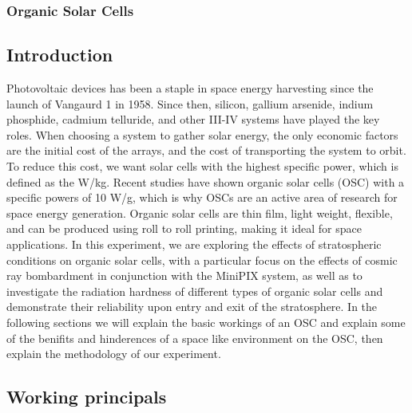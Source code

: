 \subsubsection{Organic Solar Cells}

	\subsection{Introduction}
	Photovoltaic devices has been a staple in space energy harvesting since the launch of Vangaurd 1 in 1958. Since then, silicon, gallium arsenide, indium phosphide, cadmium telluride, and other III-IV systems have played the key roles. When choosing a system to gather solar energy, the only economic factors are the initial cost of the arrays, and the cost of transporting the system to orbit. To reduce this cost, we want solar cells with the highest specific power, which is defined as the W/kg. Recent studies have shown organic solar cells (OSC) with a specific powers of 10 W/g, which is why OSCs are an active area of research for space energy generation. Organic solar cells are thin film, light weight, flexible, and can be produced using roll to roll printing, making it ideal for space applications. In this experiment, we are exploring the effects of stratospheric conditions on organic solar cells, with a particular focus on the effects of cosmic ray bombardment in conjunction with the MiniPIX system, as well as to investigate the radiation hardness of different types of organic solar cells and demonstrate their reliability upon entry and exit of the stratosphere. In the following sections we will explain the basic workings of an OSC and explain some of the benifits and hinderences of a space like environment on the OSC, then explain the methodology of our experiment.
	\cite{Space organics}
	\subsection{Working principals}

